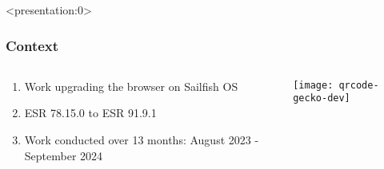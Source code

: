 \documentclass[
	notes=none,
	aspectratio=169
]{beamer}
\begin{document}

\begin{frame}<presentation:0>
\frametitle{Context}

\begin{columns}[T]
\begin{column}[T]{0.7\textwidth}
\setlength{\parskip}{0.5em}

\vspace{2.0cm}
\begin{enumerate}
\setlength{\parskip}{0.5em}
\item Work upgrading the browser on Sailfish OS
\item ESR 78.15.0 to ESR 91.9.1
\item Work conducted over 13 months: August 2023 - September 2024
\end{enumerate}

\end{column}
\begin{column}[T]{0.3\textwidth}
\setlength{\parskip}{0.5em}

\vspace{0.5cm}


\vspace{0.5cm}
{\centering

\texttt{[image: qrcode-gecko-dev]}

\vspace{-0.1cm}

}

\end{column}
\end{columns}

\end{frame}
\note{
}

\end{document}

